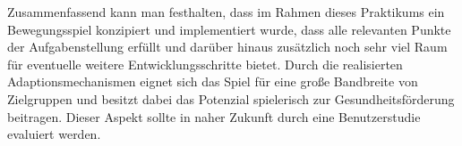 Zusammenfassend kann man festhalten, dass im Rahmen dieses Praktikums ein Bewegungsspiel konzipiert und implementiert wurde, dass alle relevanten Punkte der Aufgabenstellung erfüllt und darüber hinaus zusätzlich noch sehr viel Raum für eventuelle weitere Entwicklungsschritte bietet. Durch die realisierten Adaptionsmechanismen eignet sich das Spiel für eine große Bandbreite von Zielgruppen und besitzt dabei das Potenzial spielerisch zur Gesundheitsförderung beitragen. Dieser Aspekt sollte in naher Zukunft durch eine Benutzerstudie evaluiert werden.
